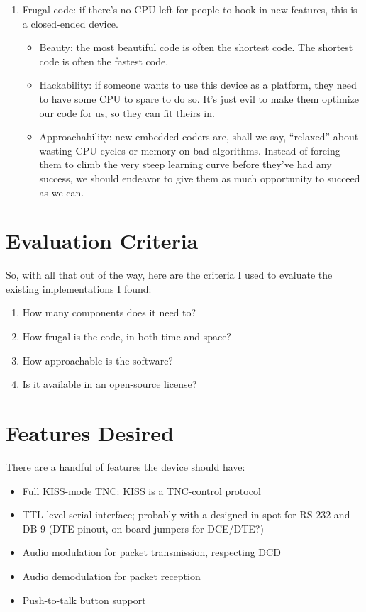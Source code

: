 \begin{enumerate}
\item Frugal code: if there's no CPU left for people to hook in new
  features, this is a closed-ended device.
\begin{itemize}
\item Beauty: the most beautiful code is often the shortest code.  The
  shortest code is often the fastest code.
\item Hackability: if someone wants to use this device as a platform,
  they need to have some CPU to spare to do so.  It's just evil to
  make them optimize our code for us, so they can fit theirs in.
\item Approachability: new embedded coders are, shall we say,
  ``relaxed'' about wasting CPU cycles or memory on bad
  algorithms.  Instead of forcing them to climb the very steep
  learning curve before they've had any success, we should endeavor to
  give them as much opportunity to succeed as we can.
\end{itemize}

\end{enumerate}


\section{Evaluation Criteria}

So, with all that out of the way, here are the criteria I used to
evaluate the existing implementations I found:
\begin{enumerate}
\item \label{criteria:components} How many components does it need to?
\item \label{criteria:frugality} How frugal is the code, in both time
  and space?
\item \label{criteria:approachability} How approachable is the software?
\item \label{criteria:license} Is it available in an open-source license?
\end{enumerate}


\section{Features Desired}

There are a handful of features the device should have:

\begin{itemize}
\item Full KISS-mode TNC: KISS is a TNC-control protocol\cite{KISS}
\item TTL-level serial interface; probably with a designed-in spot for
  RS-232 and DB-9 (DTE pinout, on-board jumpers for DCE/DTE?)
\item Audio modulation for packet transmission, respecting DCD
\item Audio demodulation for packet reception
\item Push-to-talk button support
\end{itemize}

